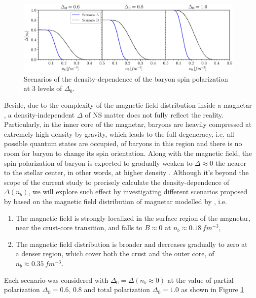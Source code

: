 \begin{figure}[ht!]
    \centering
    \includegraphics[width=\textwidth]{fig/Delta.eps}
    \caption{Scenarios of the density-dependence of the baryon spin polarization at 3 levels of $\Delta_0$.}
    \label{fig:Delta}
\end{figure} 
Beside, due to the complexity of the magnetic field distribution inside a magnetar \citep{fujisawa2014magnetic}, a density-independent $\Delta$ of \gls{NS} matter does not fully reflect the reality. Particularly, in the inner core of the magnetar, baryons are heavily compressed at extremely high density by gravity, which leads to the full degeneracy, i.e. all possible quantum states are occupied, of baryons in this region and there is no room for baryon to change its spin orientation. Along with the magnetic field, the spin polarization of baryon is expected to gradually weaken to $\Delta \approx 0$ the nearer to the stellar center, in other words, at higher density \citep{fujisawa2014magnetic,tan2020spin}. Although it's beyond the scope of the current study to precisely calculate the density-dependence of $\Delta(n_b)$, we will explore such effect by investigating different scenarios proposed by \cite{tan2020spin} based on the magnetic field distribution of magnetar modelled by \cite{fujisawa2014magnetic}, i.e.
\begin{enumerate}[label=(\Alph*)]
    \item The magnetic field is strongly localized in the surface region of the magnetar, near the crust-core transition, and falls to $B\approx 0$ at $n_b \approx 0.18\: fm^{-3}$,
    \item The magnetic field distribution is broader and decreases gradually to zero at a denser region, which cover both the crust and the outer core, of $n_b \approx 0.35\:fm^{-3}$.
\end{enumerate}
Each scenario was considered with $\Delta_0 = \Delta(n_b \approx 0)$ at the value of partial polarization $\Delta_0 = 0.6$, $0.8$ and total polarization $\Delta_0 = 1.0$ as shown in Figure \ref{fig:Delta}

